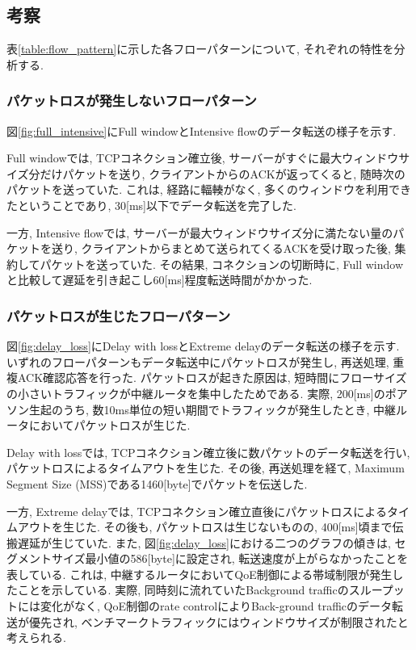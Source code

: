 \documentclass[11pt, a4paper, uplatex]{jsarticle}
\begin{document}
\subsection{考察}
表\ref{table:flow_pattern}に示した各フローパターンについて, それぞれの特性を分析する.

\subsubsection{パケットロスが発生しないフローパターン}
図\ref{fig:full_intensive}にFull windowとIntensive flowのデータ転送の様子を示す.

Full windowでは, TCPコネクション確立後, サーバーがすぐに最大ウィンドウサイズ分だけパケットを送り,
クライアントからのACKが返ってくると, 随時次のパケットを送っていた.
これは, 経路に輻輳がなく, 多くのウィンドウを利用できたということであり, 30[ms]以下でデータ転送を完了した.

一方, Intensive flowでは, サーバーが最大ウィンドウサイズ分に満たない量のパケットを送り,
クライアントからまとめて送られてくるACKを受け取った後, 集約してパケットを送っていた.
その結果, コネクションの切断時に, Full windowと比較して遅延を引き起こし60[ms]程度転送時間がかかった.

\subsubsection{パケットロスが生じたフローパターン}
図\ref{fig:delay_loss}にDelay with lossとExtreme delayのデータ転送の様子を示す.
いずれのフローパターンもデータ転送中にパケットロスが発生し, 再送処理, 重複ACK確認応答を行った.
パケットロスが起きた原因は, 短時間にフローサイズの小さいトラフィックが中継ルータを集中したためである.
実際, 200[ms]のポアソン生起のうち, 数10ms単位の短い期間でトラフィックが発生したとき, 中継ルータにおいてパケットロスが生じた.

Delay with lossでは, TCPコネクション確立後に数パケットのデータ転送を行い, パケットロスによるタイムアウトを生じた.
その後, 再送処理を経て, Maximum Segment Size (MSS)である1460[byte]でパケットを伝送した.

一方, Extreme delayでは, TCPコネクション確立直後にパケットロスによるタイムアウトを生じた.
その後も, パケットロスは生じないものの, 400[ms]頃まで伝搬遅延が生じていた.
また, 図\ref{fig:delay_loss}における二つのグラフの傾きは, セグメントサイズ最小値の586[byte]に設定され,
転送速度が上がらなかったことを表している.
これは, 中継するルータにおいてQoE制御による帯域制限が発生したことを示している.
実際, 同時刻に流れていたBackground trafficのスループットには変化がなく, QoE制御のrate controlによりBack-ground
trafficのデータ転送が優先され, ベンチマークトラフィックにはウィンドウサイズが制限されたと考えられる.
\end{document}
